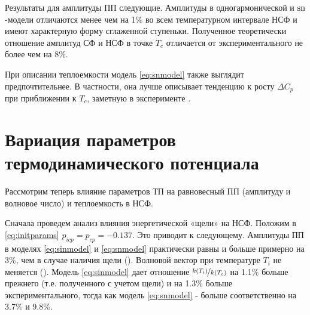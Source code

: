 Результаты для амплитуды ПП  следующие. Амплитуды в одногармонической и $\operatorname{sn}$-модели отличаются менее чем на 1\% во всем температурном интервале НСФ и имеют характерную форму сглаженной ступеньки. 
Полученное теоретически отношение амплитуд СФ и НСФ в точке $T_c$ отличается от экспериментального \cite{Vysochanskii1994} не более чем на 8\%.

При описании теплоемкости  модель \eqref{eq:snmodel} также выглядит предпочтительнее. 
В частности, она лучше описывает тенденцию к росту $\Delta C_p$ при приближении к $T_c$, заметную в эксперименте .


\section{Вариация параметров термодинамического потенциала}\label{sec:variate}

Рассмотрим теперь влияние параметров ТП на равновесный ПП (амплитуду и волновое число) и теплоемкость в НСФ.

Сначала проведем анализ влияния энергетической «щели» на НСФ. Положим в \eqref{eq:initparams} $p_{icp} = p_{cp} = -0.137$. Это приводит к следующему. Амплитуды ПП в моделях \eqref{eq:sinmodel} и \eqref{eq:snmodel} практически равны и больше примерно на 3\%, чем в случае наличия щели (). Волновой вектор при температуре $T_i$ не меняется (). Модель \eqref{eq:sinmodel} дает отношение $\nicefrac{k(T_i)}{k(T_c)}$ на 1.1\% больше прежнего (т.е. полученного с учетом щели) и на 1.3\% больше экспериментального, тогда как модель \eqref{eq:snmodel} - больше соответственно на 3.7\% и 9.8\%.


